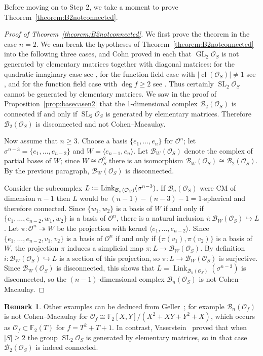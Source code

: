 \documentclass[11 pt]{article}
\theoremstyle{plain}
\theoremstyle{definition}
\newtheorem{remark}[theorem]{Remark}
\numberwithin{equation}{section}
\DeclareMathOperator{\GL}{GL}
\DeclareMathOperator{\SL}{SL}
\newcommand\F{\ensuremath{\mathbb{F}}}
\renewcommand{\O}{\mathcal{O}}
\newcommand\PartialBases{\ensuremath{\mathcal{B}}}
\newcommand{\PB}{\PartialBases}
\DeclareMathOperator{\class}{cl}
\DeclareMathOperator{\Link}{Link}
\newcommand\into{\hookrightarrow}
\newcommand\onto{\twoheadrightarrow}
\newcommand\coloneq{\mathrel{\mathop:}\mkern-1.2mu=}
\newcommand\abs[1]{\left\lvert#1\right\rvert}
\newcommand\iso{\cong}
\begin{document}
Before moving on to Step 2, we take a moment to prove Theorem~\ref{theorem:B2notconnected}.
\begin{proof}[Proof of Theorem~\ref{theorem:B2notconnected}]
We first prove the theorem in the case $n=2$. 
We can break the hypotheses of Theorem~\ref{theorem:B2notconnected} into the following three cases, and Cohn proved in each that $\GL_2 \O_S$ is not generated by elementary matrices together with diagonal matrices: for the quadratic imaginary case see \cite[Theorem 6.1]{Cohn}, for the function field case with $\abs{\class(\O_S)}\neq 1$ see \cite[Corollary~%
5.6]{Cohn}, and for the function field case with $\deg f\geq 2$ see \cite[Theorem 6.2]{Cohn}. Thus certainly $\SL_2\O_S$ cannot be generated by elementary matrices. We saw in the proof of Proposition~\ref{prop:basecasen2} that the 1-dimensional complex $\PB_2(\O_S)$ is connected if and only if $\SL_2 \O_S$ is generated by elementary matrices. Therefore $\PB_2(\O_S)$ is disconnected and not Cohen--Macaulay.

Now assume that $n\geq 3$. Choose a basis $\{e_1,\ldots,e_n\}$ for $\O^n$; let $\sigma^{n-3}=\{e_1,\ldots,e_{n-2}\}$ and $W=\langle e_{n-1},e_n\rangle$. Let $\PB_W(\O_S)$ denote the complex of partial bases of $W$; since $W\iso \O_S^2$ there is an isomorphism $\PB_W(\O_S)\iso \PB_2(\O_S)$. By the previous paragraph, $\PB_W(\O_S)$ is disconnected.

Consider the subcomplex $L\coloneq \Link_{\PB_n(\O_S)}(\sigma^{n-3})$. If $\PB_n(\O_S)$ were CM of dimension $n-1$ then $L$ would be $(n-1)-(n-3)-1=1$-spherical and therefore connected. 
Since $\{w_1,w_2\}$ is a basis of $W$ if and only if $\{e_1,\ldots,e_{n-2},w_1,w_2\}$ is a basis of $\O^n$, there
is a natural inclusion $i\colon \PB_W(\O_S)\into L$.  Let $\pi\colon \O^n\onto W$ be the projection with kernel $\langle e_1,\ldots,e_{n-2}\rangle$. Since $\{e_1,\ldots,e_{n-2},v_1,v_2\}$ is a basis of $\O^n$ if and only if $\{\pi(v_1),\pi(v_2)\}$ is a basis of $W$, the projection $\pi$ induces a simplicial map $\pi\colon L\to \PB_W(\O_S)$. By definition $i\colon \PB_W(\O_S)\into L$ is a section of this projection, so $\pi\colon L\to \PB_W(\O_S)$ is surjective. Since $\PB_W(\O_S)$ is disconnected, this shows that $L=\Link_{\PB_n(\O_S)}(\sigma^{n-3})$ is disconnected, so the $(n-1)$-dimensional complex $\PB_n(\O_S)$ is not Cohen--Macaulay.
\end{proof}

\begin{remark}
Other examples can be deduced from Geller~\cite{Geller}; for example $\PB_n(\O_f)$ is not Cohen--Macaulay for $\O_f\iso \F_2[X,Y]/(X^2+XY+Y^2+X)$, which occurs as $\O_f\subset \F_2(T)$ for $f=T^2+T+1$. In contrast, Vaserstein~\cite{VasersteinGen} proved that when $\abs{S}\geq 2$ the group $\SL_2\O_S$ is generated by elementary matrices, so in that case $\PB_2(\O_S)$ is indeed connected.
\end{remark}
\end{document}
